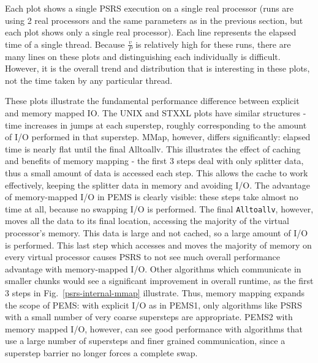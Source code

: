 \documentclass[12pt]{carletoncsthesis}
\begin{document}
Each plot shows a single PSRS execution on a single real processor (runs are
using 2 real processors and the same parameters as in the previous section,
but each plot shows only a single real processor).  Each line represents the
elapsed time of a single thread.  Because $\frac{v}{P}$ is relatively high
for these runs, there are many lines on these plots and distinguishing each
individually is difficult.  However, it is the overall trend and distribution
that is interesting in these plots, not the time taken by any particular
thread.

These plots illustrate the fundamental performance difference between explicit
and memory mapped IO.  The UNIX and STXXL plots have similar structures -
time increases in jumps at each superstep, roughly corresponding to the amount
of I/O performed in that superstep.  MMap, however, differs significantly:
elapsed time is nearly flat until the final Alltoallv.  This illustrates the
effect of caching and benefits of memory mapping - the first 3 steps deal
with only splitter data, thus a small amount of data is accessed each step.
This allows the cache to work effectively, keeping the splitter data in
memory and avoiding I/O.  The advantage of memory-mapped I/O in PEMS is
clearly visible: these steps take almost no time at all, because no swapping
I/O is performed.  The final {\tt Alltoallv}, however, moves all the data to
its final location, accessing the majority of the virtual processor's memory.
This data is large and not cached, so a large amount of I/O is performed.
This last step which accesses and moves the majority of memory on every
virtual processor causes PSRS to not see much overall performance advantage
with memory-mapped I/O.  Other algorithms which communicate in smaller chunks
would see a significant improvement in overall runtime, as the first 3 steps
in Fig.~\ref{psrs-internal-mmap} illustrate.  Thus, memory mapping expands
the scope of PEMS: with explicit I/O as in PEMS1, only algorithms like PSRS
with a small number of very coarse supersteps are appropriate.  PEMS2 with
memory mapped I/O, however, can see good performance with algorithms that
use a large number of supersteps and finer grained communication, since a
superstep barrier no longer forces a complete swap.
\end{document}
